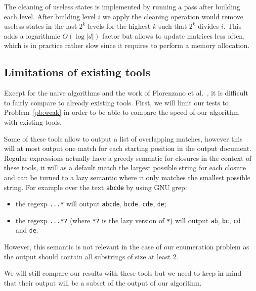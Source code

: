 \documentclass[11px]{article}
\theoremstyle{definition}
\newcommand{\pierre}[1]{\textcolor{magenta}{[\textbf{Pierre:} #1]}}
\begin{document}
      The cleaning of useless states is implemented by running a pass after
      building each level. After building level $i$ we apply the cleaning
      operation would remove useless states in the last $2^k$ levels for the
      highest $k$ such that $2^k$ divides $i$. This adds a logarithmic $O(\log
      |d|)$ factor but allows to update  matrices less often,
      which is in practice rather slow since it requires to perform a memory
      allocation.

    \subsection{Limitations of existing tools}

      Except for the naive algorithms and the work of Florenzano et
      al.~\cite{florenzano2018constant}, it is difficult to fairly compare to
      already existing tools. First, we will limit our tests to
      Problem~\ref{pb:weak} in order to be able to compare the speed of our
      algorithm with existing tools.

      Some of these tools
      allow to output a list of overlapping matches,
      however this will at most output one match for each starting position in
      the output document. Regular expressions actually have a greedy semantic
      for closures in the context of these tools, it will as a default match
      the largest possible string for each closure and can be turned to a lazy
      semantic where it only matches the smallest possible string. For example
      over the text \texttt{abcde} by using GNU grep:
        \begin{itemize}
          \item the regexp \texttt{...*} will output \texttt{abcde},
            \texttt{bcde}, \texttt{cde}, \texttt{de};
          \item the regexp \texttt{...*?} (where \texttt{*?} is the lazy
            version of \texttt{*}) will output \texttt{ab}, \texttt{bc},
            \texttt{cd} and \texttt{de}.
        \end{itemize}
      However, this semantic is not relevant in the case of our enumeration
      problem as the output should contain all substrings of size at least 2.

      We will still compare our results with these tools but we need to
      keep in mind that their output will be a subset of the output of our
      algorithm.
\end{document}
